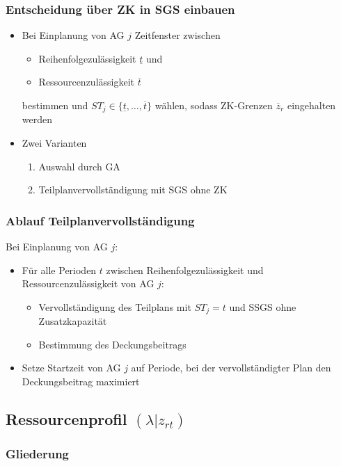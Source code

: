 
\begin{frame}[noframenumbering]
\frametitle{Entscheidung über ZK in SGS einbauen}
\begin{itemize}
\item Bei Einplanung von AG $j$ Zeitfenster zwischen
	\begin{itemize}
	\item Reihenfolgezulässigkeit $\underline{t}$ und
	\item Ressourcenzulässigkeit $\overline{t}$
	\end{itemize}
bestimmen und $ST_j \in \{ \underline{t}, \ldots, \overline{t} \}$ wählen, sodass ZK-Grenzen $\overline{z}_r$ eingehalten werden\\[8mm]
\item Zwei Varianten
\begin{enumerate}
	\item Auswahl durch GA 
	\item Teilplanvervollständigung mit SGS ohne ZK
	\end{enumerate}
\end{itemize}
\end{frame}

\begin{frame}[noframenumbering]
	\frametitle{Ablauf Teilplanvervollständigung}
	Bei Einplanung von AG $j$:
	\vspace*{2mm}
	\begin{itemize}
		\item Für alle Perioden $t$ zwischen Reihenfolgezulässigkeit und Ressourcenzulässigkeit von AG $j$:
		\begin{itemize}
			\item Vervollständigung des Teilplans mit $ST_j=t$ und SSGS ohne Zusatzkapazität
			\item Bestimmung des Deckungsbeitrags\\[3mm]
		\end{itemize}
		\item Setze Startzeit von AG $j$ auf Periode, bei der vervollständigter Plan den Deckungsbeitrag maximiert
	\end{itemize}
\end{frame}


\subsection{Ressourcenprofil $(\lambda|z_{rt})$}
\begin{frame}[noframenumbering]
	\frametitle{Gliederung}
	\tableofcontents[currentsubsection]
\end{frame}

